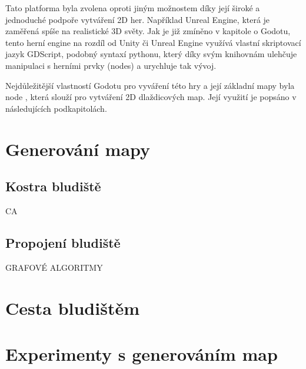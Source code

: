 Tato platforma byla zvolena oproti jiným možnostem díky její široké a jednoduché podpoře vytváření 2D her. Například Unreal Engine, která je zaměřená spíše na realistické 3D světy. Jak je již zmíněno v kapitole o Godotu, tento herní engine na rozdíl od Unity či Unreal Engine využívá vlastní skriptovací jazyk GDScript, podobný syntaxí pythonu, který díky svým knihovnám ulehčuje manipulaci s herními prvky (nodes) a urychluje tak vývoj.

Nejdůležitější vlastností Godotu pro vyváření této hry a její základní mapy byla node , která slouží pro vytváření 2D dlaždicových map. Její využití je popsáno v následujících podkapitolách.
    
\section{Generování mapy}
\subsection*{Kostra bludiště}
CA
\subsection*{Propojení bludiště}
GRAFOVÉ ALGORITMY

\section{Cesta bludištěm} %

\newpage
\section{Experimenty s generováním map} %

